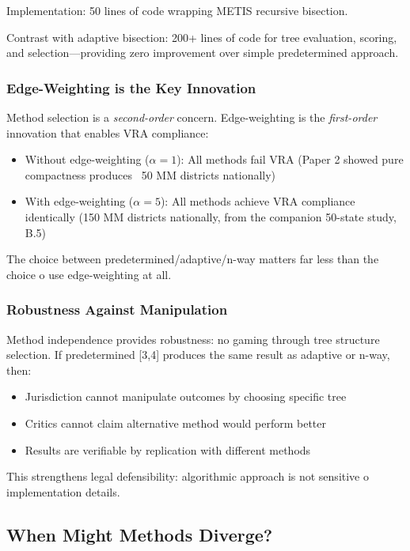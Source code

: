 Implementation: 50 lines of code wrapping METIS recursive bisection.

Contrast with adaptive bisection: 200+ lines of code for tree evaluation, scoring, and selection—providing zero improvement over simple predetermined approach.

\subsubsection{Edge-Weighting is the Key Innovation}

Method selection is a \textit{second-order} concern. Edge-weighting is the \textit{first-order} innovation that enables VRA compliance:
\begin{itemize}
\item Without edge-weighting ($\alpha = 1$): All methods fail VRA (Paper 2 showed pure compactness produces ~50 MM districts nationally)
\item With edge-weighting ($\alpha = 5$): All methods achieve VRA compliance identically (150 MM districts nationally, from the companion 50-state study, B.5)
\end{itemize}

The choice between predetermined/adaptive/n-way matters far less than the choice 	o use edge-weighting at all.

\subsubsection{Robustness Against Manipulation}

Method independence provides robustness: no gaming through tree structure selection. If predetermined [3,4] produces the same result as adaptive or n-way, then:
\begin{itemize}
\item Jurisdiction cannot manipulate outcomes by choosing specific tree
\item Critics cannot claim alternative method would perform better
\item Results are verifiable by replication with different methods
\end{itemize}

This strengthens legal defensibility: algorithmic approach is not sensitive 	o implementation details.

\subsection{When Might Methods Diverge?}

